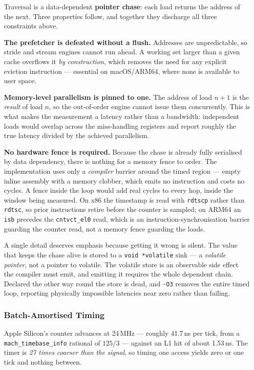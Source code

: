 \documentclass[conference]{IEEEtran}
\begin{document}
Traversal is a data-dependent \textbf{pointer chase}: each load returns the
address of the next. Three properties follow, and together they discharge all
three constraints above.

\textbf{The prefetcher is defeated without a flush.} Addresses are unpredictable,
so stride and stream engines cannot run ahead. A working set larger than a given
cache overflows it \emph{by construction}, which removes the need for any explicit
eviction instruction --- essential on macOS/ARM64, where none is available to user
space.

\textbf{Memory-level parallelism is pinned to one.} The address of load $n{+}1$ is
the \emph{result} of load $n$, so the out-of-order engine cannot issue them
concurrently. This is what makes the measurement a latency rather than a
bandwidth: independent loads would overlap across the miss-handling registers and
report roughly the true latency divided by the achieved parallelism.

\textbf{No hardware fence is required.} Because the chase is already fully
serialised by data dependency, there is nothing for a memory fence to order. The
implementation uses only a \emph{compiler} barrier around the timed region ---
empty inline assembly with a memory clobber, which emits no instruction and costs
no cycles. A fence inside the loop would add real cycles to every hop, inside the
window being measured. On x86 the timestamp is read with \texttt{rdtscp} rather
than \texttt{rdtsc}, so prior instructions retire before the counter is sampled;
on ARM64 an \texttt{isb} precedes the \texttt{cntvct\_el0} read, which is an
instruction-synchronisation barrier guarding the counter read, not a memory fence
guarding the loads.

A single detail deserves emphasis because getting it wrong is silent. The value
that keeps the chase alive is stored to a \texttt{void~*volatile} sink --- a
\emph{volatile pointer}, not a pointer to volatile. The volatile store is an
observable side effect the compiler must emit, and emitting it requires the whole
dependent chain. Declared the other way round the store is dead, and
\texttt{-O3} removes the entire timed loop, reporting physically impossible
latencies near zero rather than failing.

\subsubsection{Batch-Amortised Timing}

Apple Silicon's counter advances at 24\,MHz --- roughly 41.7\,ns per tick, from a
\texttt{mach\_timebase\_info} rational of $125/3$ --- against an L1 hit of about
1.53\,ns. The timer is \emph{27 times coarser than the signal}, so timing one
access yields zero or one tick and nothing between.
\end{document}
